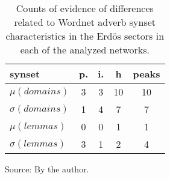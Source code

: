 \begin{table}[h!]
\begin{center}
\caption{Counts of evidence of differences related to Wordnet adverb synset characteristics in the Erd\"os sectors in each of the analyzed networks.}
\begin{tabular}{| l || c | c | c || c |}\hline
{\bf synset} & {\bf p.} & {\bf i.} & {\bf h} & {\bf peaks} \\\hline\hline
$\mu(domains)$ & 3  & 3  & 10  & 10 \\
$\sigma(domains)$ & 1  & 4  & 7  & 7 \\\hline
$\mu(lemmas)$ & 0  & 0  & 1  & 1 \\
$\sigma(lemmas)$ & 3  & 1  & 2  & 4 \\\hline
\end{tabular}
\begin{flushleft}
		Source: By the author.\
\end{flushleft}
\end{center}
\end{table}
